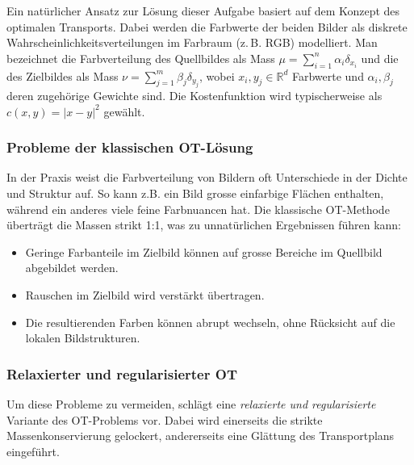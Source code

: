 Ein natürlicher Ansatz zur Lösung dieser Aufgabe
basiert auf dem Konzept des optimalen Transports.
Dabei werden die Farbwerte der beiden Bilder
als diskrete Wahrscheinlichkeitsverteilungen im Farbraum (z.\,B. RGB) modelliert.
Man bezeichnet die Farbverteilung des Quellbildes
als Mass $\mu = \sum_{i=1}^n \alpha_i \delta_{x_i}$ und
die des Zielbildes als Mass $\nu = \sum_{j=1}^m \beta_j \delta_{y_j}$,
wobei $x_i, y_j \in \mathbb{R}^d$ Farbwerte und
$\alpha_i, \beta_j$ deren zugehörige Gewichte sind.
Die Kostenfunktion wird typischerweise als $c(x,y) = |x - y|^2$ gewählt.

\subsubsection{Probleme der klassischen OT-Lösung}
In der Praxis weist die Farbverteilung von Bildern
oft Unterschiede in der Dichte und Struktur auf.
So kann z.B. ein Bild grosse einfarbige Flächen enthalten,
während ein anderes viele feine Farbnuancen hat.
Die klassische OT-Methode überträgt die Massen strikt 1:1,
was zu unnatürlichen Ergebnissen führen kann:
\begin{itemize}
\item Geringe Farbanteile im Zielbild können
auf grosse Bereiche im Quellbild abgebildet werden.
\item Rauschen im Zielbild wird verstärkt übertragen.
\item Die resultierenden Farben können abrupt wechseln,
ohne Rücksicht auf die lokalen Bildstrukturen.
\end{itemize}

\subsubsection{Relaxierter und regularisierter OT}
Um diese Probleme zu vermeiden,
schlägt \cite{mongekant:color} eine \emph{relaxierte und regularisierte}
Variante des OT-Problems vor.
Dabei wird einerseits die strikte Massenkonservierung gelockert,
andererseits eine Glättung des Transportplans eingeführt.

